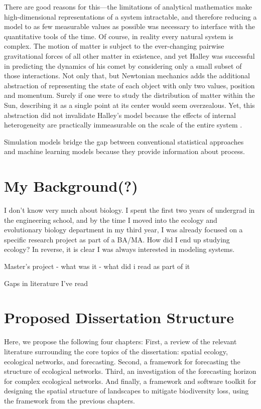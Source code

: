 \documentclass[]{article}
\begin{document}
There are good reasons for this---the limitations of analytical mathematics make high-dimensional representations of a system intractable, and therefore reducing a model to as few measurable values as possible was necessary to interface with the quantitative tools of the time. Of course, in reality every natural system is complex.
The motion of matter is subject to the ever-changing pairwise gravitational forces of all other matter in existence, and yet Halley was successful in predicting the dynamics of his comet by considering only a small subset of those interactions.
Not only that, but Newtonian mechanics adds the additional abstraction of representing the state of each object with only two values, position and momentum. Surely if one were to study the distribution of matter within the Sun, describing it as a single point at its center would seem overzealous. Yet, this abstraction did not invalidate Halley's model because the effects of internal heterogeneity are practically immeasurable on the scale of the entire system \cite{levins_dialectical_1987}.

Simulation models bridge the gap between conventional statistical approaches and machine learning models because they provide information about process. 


\section{My Background(?)}

I don't know very much about biology. I spent the first
two years of undergrad in the engineering school, and by the time I moved into the ecology and evolutionary biology department in my third year, I was already focused on a specific research project as part of a BA/MA. How did I end up studying ecology? In reverse, it is clear I was always interested in modeling systems.

Master's project
- what was it
- what did i read as part of it

Gaps in literature I've read

\section{Proposed Dissertation Structure}

Here, we propose the following four chapters:
First, a review of the relevant literature surrounding the core topics of the dissertation: spatial ecology, ecological networks, and forecasting. Second, a framework for forecasting the structure of ecological networks. Third, an investigation of the forecasting horizon for complex ecological networks. And finally, a framework and software toolkit for designing the spatial structure of landscapes to mitigate biodiversity loss, using the framework from the previous chapters.
\end{document}
